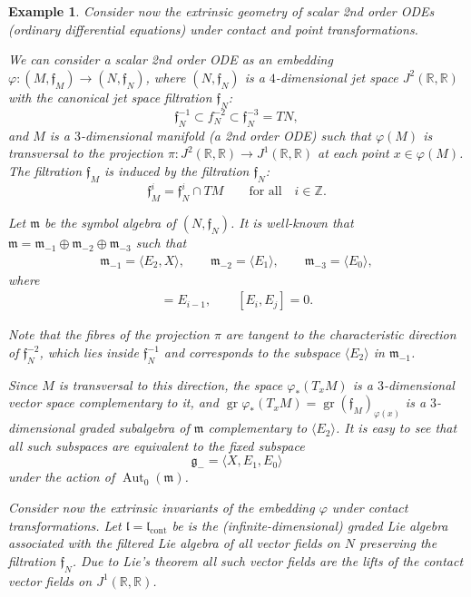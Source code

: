 \documentclass[10pt,a4paper]{amsart}
\newcommand{\R}{\mathbb R}
\newcommand{\Z}{\mathbb Z}
\newcommand{\f}{\mathfrak f}
\newcommand{\g}{\mathfrak g}
\newcommand{\lf}{\mathfrak l}
\newcommand{\m}{\mathfrak m}
\newcommand{\Aut}{\operatorname{Aut}}
\newcommand{\gr}{\operatorname{gr}}
\newtheorem{ex}[thm]{Example}
\numberwithin{equation}{section}
\begin{document}
\begin{ex}
	Consider now the extrinsic geometry of scalar 2nd order ODEs (ordinary differential equations) under contact and point transformations.
	
	We can consider a scalar 2nd order ODE as an embedding $\varphi\colon (M,\f_M)\to (N,\f_N)$, where $(N,\f_N)$ is a $4$-dimensional jet space $J^2(\R,\R)$ with the canonical jet space filtration $\f_N$:
	\[
	\f_N^{-1} \subset f_N^{-2} \subset \f_N^{-3} = TN,
	\]
	and $M$ is a $3$-dimensional manifold (a 2nd order ODE) such that $\varphi(M)$ is transversal to the projection $\pi\colon J^2(\R,\R)\to J^1(\R,\R)$ at each point $x\in\varphi(M)$. The filtration $\f_M$ is induced by the filtration $\f_N$:
	\[
	\f_M^{i} = \f_N^{i}\cap TM\qquad\text{for all}\quad i\in \Z.
	\]
	
{\samepage	Let $\m$ be the symbol algebra of $(N,\f_N)$. It is well-known that $\m=\m_{-1}\oplus \m_{-2}\oplus \m_{-3}$ such that
	\begin{gather*}
	\m_{-1} = \langle E_2, X \rangle, \qquad
	\m_{-2} = \langle E_1 \rangle, \qquad
	\m_{-3} = \langle E_0 \rangle,
	\end{gather*}
where
	\begin{gather*}
[X,E_i] = E_{i-1},\qquad [E_i,E_j]=0.
	\end{gather*}

}

\noindent
Note that the fibres of the projection $\pi$ are tangent to the characteristic direction of $\f_{N}^{-2}$, which lies inside $\f_N^{-1}$ and corresponds to the subspace $\langle E_2 \rangle$ in $\m_{-1}$.
	
	Since $M$ is transversal to this direction, the space $\varphi_*(T_xM)$ is a $3$-dimensional vector space complementary to it, and $\gr \varphi_*(T_xM) = \gr (\f_M)_{\varphi(x)}$ is a $3$-dimensional graded subalgebra of $\m$ complementary to $\langle E_2 \rangle$. It is easy to see that all such subspaces are equivalent to the fixed subspace
	\[
	\g_{-} = \langle X,E_1, E_0 \rangle
	\]
	under the action of $\Aut_0(\m)$.
	
	Consider now the extrinsic invariants of the embedding $\varphi$ under contact transformations. Let $\lf=\lf_{\text{cont}}$ be is the (infinite-dimensional) graded Lie algebra associated with the filtered Lie algebra of all vector fields on $N$ preserving the filtration $\f_N$. Due to Lie's theorem all such vector fields are the lifts of the contact vector fields on $J^1(\R,\R)$.
	

\end{ex}
\end{document}
